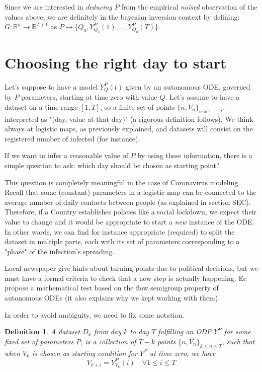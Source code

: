 \documentclass[9pt]{article}
\newtheorem{definition}{Definition}
\begin{document}
Since we are interested in \emph{deducing} $P$ 
from the empirical \emph{noised} observation of the values above,
we are definitely in the bayesian inversion context  by defining:
$G : \mathbb{R}^n \to \mathbb{R}^{T+1}$ as
$P \mapsto \{Q_0, Y_{Q_0}^P(1), \dots, Y_{Q_0}^P (T)\}$.

\section{Choosing the right day to start}
Let's suppose to have a model $Y_Q^P(t)$ given by an autonomous
ODE, governed by $P$ parameters, starting at time zero with value $Q$.
Let's assume to have a dataset on a time range $[1, T]$,
so a finite set of points $ \{n, V_n\}_{n = 1,\dots,T}$,
 interpreted as "(day, value at that day)" (a rigorous definition follows). 
We think always at logistic maps, as previously explained, and 
datasets will consist on the registered number of infected (for instance). 


If we want to infer a reasonable value of $P$ by using these information, 
there is a simple question to ask: which day should be 
chosen as starting point?  


This question is completely meaningful in the case of Coronavirus
modeling. Recall that some (constant) parameters in a logistic map
can be connected to the average number
of daily contacts between people (as explained in section SEC).
Therefore, if a Country establishes policies
like a social lockdown, we expect their value to change and
it would be appropriate to start
 a \emph{new} instance of the ODE. In other words, we can find for instance
 appropriate (required) to split the dataset in multiple parts, each with 
 its set of parameters corresponding to a "phase" of the infection's spreading.


Local newspaper give hints about turning points due to political decisions,
but we must have a formal criteria to check that a new step is actually
happening.
Ee propose a mathematical test based
on the flow semigroup property of
autonomous ODEs 
(it also explains why we kept working with them).


In order to avoid ambiguity, we need to fix some notation.
\begin{definition}
	A dataset $D_k$ from day $k$ to day $T$ \emph{fulfilling}
	an ODE $Y^P$ for some fixed set of parameters $P$,
	is a collection of $T - k$ points 
	$\{n, V_n\}_{k \leq n \leq T}$, such that
	when $V_k$ is chosen as starting condition
	for $Y^P$ at time zero, we have 
\begin{equation}
	V_{k + i} = Y_{V_k}^P(i) \quad \forall 1 \leq i \leq T
\end{equation}
\end{definition}
\end{document}

